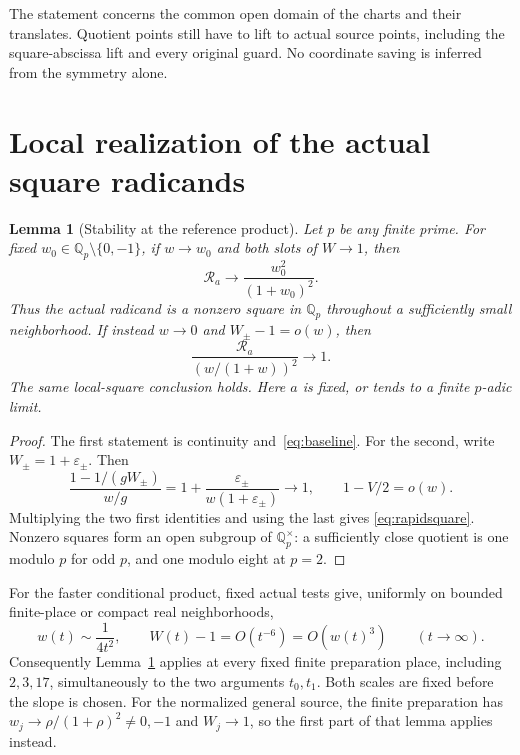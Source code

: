 \documentclass[11pt,a4paper]{article}
\newtheorem{lemma}[theorem]{Lemma}
\newcommand{\Q}{\mathbb Q}\newcommand{\Z}{\mathbb Z}
\begin{document}
The statement concerns the common open domain of the charts and their
translates. Quotient points still have to lift to actual source points,
including the square-abscissa lift and every original guard. No
coordinate saving is inferred from the symmetry alone.

\section{Local realization of the actual square radicands}

\begin{lemma}[Stability at the reference product]\label{lem:stability}
Let $p$ be any finite prime. For fixed $w_0\in\Q_p\setminus\{0,-1\}$,
if $w\to w_0$ and both slots of $W\to1$, then
\[
                  \mathcal R_a\longrightarrow
                           \frac{w_0^2}{(1+w_0)^2}.
\]
Thus the actual radicand is a nonzero square in $\Q_p$ throughout a
sufficiently small neighborhood. If instead $w\to0$ and
$W_\pm-1=o(w)$, then
\begin{equation}\label{eq:rapidsquare}
             \frac{\mathcal R_a}{(w/(1+w))^2}\longrightarrow1.
\end{equation}
The same local-square conclusion holds. Here $a$ is fixed, or tends
to a finite $p$-adic limit.
\end{lemma}
\begin{proof}
The first statement is continuity and~\eqref{eq:baseline}. For the
second, write $W_\pm=1+\varepsilon_\pm$. Then
\[
 \frac{1-1/(gW_\pm)}{w/g}
             =1+\frac{\varepsilon_\pm}{w(1+\varepsilon_\pm)}
             \longrightarrow1,
 \qquad 1-V/2=o(w).
\]
Multiplying the two first identities and using the last gives
\eqref{eq:rapidsquare}. Nonzero squares form an open subgroup of
$\Q_p^\times$: a sufficiently close quotient is one modulo $p$ for
odd $p$, and one modulo eight at $p=2$.
\end{proof}

For the faster conditional product, fixed actual tests give, uniformly
on bounded finite-place or compact real neighborhoods,
\begin{equation}\label{eq:infinity}
 w(t)\sim\frac1{4t^2},\qquad
 W(t)-1=O(t^{-6})=O(w(t)^3)\qquad(t\longrightarrow\infty).
\end{equation}
Consequently Lemma~\ref{lem:stability} applies at every fixed finite
preparation place, including $2,3,17$, simultaneously to the two
arguments $t_0,t_1$. Both scales are fixed before the slope is chosen.
For the normalized general source, the finite preparation has
$w_j\to\rho/(1+\rho)^2\ne0,-1$ and $W_j\to1$, so the first
part of that lemma applies instead.
\end{document}
